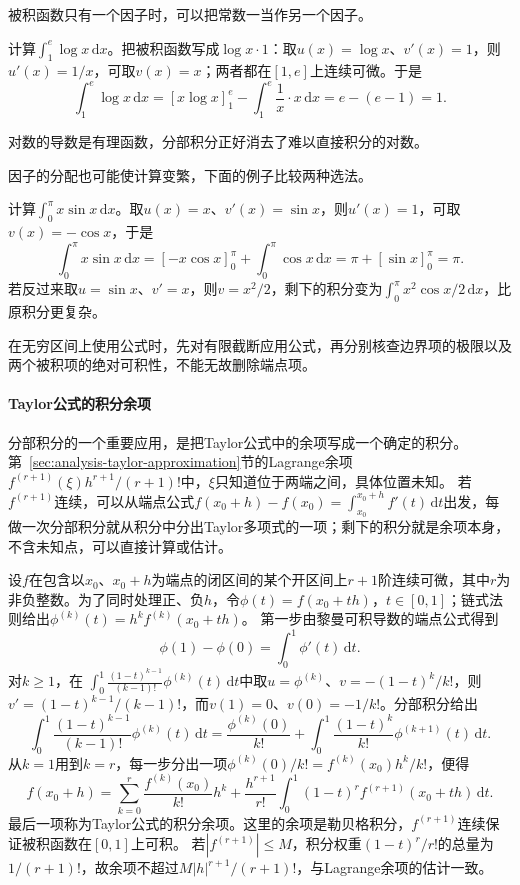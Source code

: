 被积函数只有一个因子时，可以把常数一当作另一个因子。
\begin{example}[把对数函数看成与常数一的乘积]
计算$\int_1^e\log x\,\mathrm dx$。把被积函数写成$\log x\cdot1$：取$u(x)=\log x$、$v'(x)=1$，则$u'(x)=1/x$，可取$v(x)=x$；两者都在$[1,e]$上连续可微。于是
\[
 \int_1^e\log x\,\mathrm dx=[x\log x]_1^e-\int_1^e\frac1x\cdot x\,\mathrm dx
 =e-(e-1)=1.
\]
\end{example}
对数的导数是有理函数，分部积分正好消去了难以直接积分的对数。

因子的分配也可能使计算变繁，下面的例子比较两种选法。
\begin{example}[因子的分配决定计算是否简化]
计算$\int_0^\pi x\sin x\,\mathrm dx$。取$u(x)=x$、$v'(x)=\sin x$，则$u'(x)=1$，可取$v(x)=-\cos x$，于是
\[
 \int_0^\pi x\sin x\,\mathrm dx=[-x\cos x]_0^\pi+\int_0^\pi\cos x\,\mathrm dx
 =\pi+[\sin x]_0^\pi=\pi.
\]
若反过来取$u=\sin x$、$v'=x$，则$v=x^2/2$，剩下的积分变为$\int_0^\pi x^2\cos x/2\,\mathrm dx$，比原积分更复杂。
\end{example}
在无穷区间上使用公式时，先对有限截断应用公式，再分别核查边界项的极限以及两个被积项的绝对可积性，不能无故删除端点项。

\paragraph{Taylor公式的积分余项}
分部积分的一个重要应用，是把Taylor公式中的余项写成一个确定的积分。
第~\ref{sec:analysis-taylor-approximation}节的Lagrange余项$f^{(r+1)}(\xi)h^{r+1}/(r+1)!$中，$\xi$只知道位于两端之间，具体位置未知。
若$f^{(r+1)}$连续，可以从端点公式$f(x_0+h)-f(x_0)=\int_{x_0}^{x_0+h}f'(t)\,\mathrm dt$出发，每做一次分部积分就从积分中分出Taylor多项式的一项；剩下的积分就是余项本身，不含未知点，可以直接计算或估计。

设$f$在包含以$x_0$、$x_0+h$为端点的闭区间的某个开区间上$r+1$阶连续可微，其中$r$为非负整数。为了同时处理正、负$h$，令$\phi(t)=f(x_0+th)$，$t\in[0,1]$；链式法则给出$\phi^{(k)}(t)=h^kf^{(k)}(x_0+th)$。
第一步由黎曼可积导数的端点公式得到
\[
 \phi(1)-\phi(0)=\int_0^1\phi'(t)\,\mathrm dt.
\]
对$k\geq1$，在
$\int_0^1\frac{(1-t)^{k-1}}{(k-1)!}\phi^{(k)}(t)\,\mathrm dt$中取$u=\phi^{(k)}$、$v=-(1-t)^k/k!$，则$v'=(1-t)^{k-1}/(k-1)!$，而$v(1)=0$、$v(0)=-1/k!$。分部积分给出
\[
 \int_0^1\frac{(1-t)^{k-1}}{(k-1)!}\phi^{(k)}(t)\,\mathrm dt
 =\frac{\phi^{(k)}(0)}{k!}
 +\int_0^1\frac{(1-t)^k}{k!}\phi^{(k+1)}(t)\,\mathrm dt.
\]
从$k=1$用到$k=r$，每一步分出一项$\phi^{(k)}(0)/k!=f^{(k)}(x_0)h^k/k!$，便得
\begin{equation}
 f(x_0+h)=\sum_{k=0}^r\frac{f^{(k)}(x_0)}{k!}h^k
 +\frac{h^{r+1}}{r!}
   \int_0^1(1-t)^r f^{(r+1)}(x_0+th)\,\mathrm dt.
\label{eq:analysis-taylor-integral-remainder}
\end{equation}
最后一项称为Taylor公式的积分余项。这里的余项是勒贝格积分，$f^{(r+1)}$连续保证被积函数在$[0,1]$上可积。
若$|f^{(r+1)}|\leq M$，积分权重$(1-t)^r/r!$的总量为$1/(r+1)!$，故余项不超过$M|h|^{r+1}/(r+1)!$，与Lagrange余项的估计一致。

